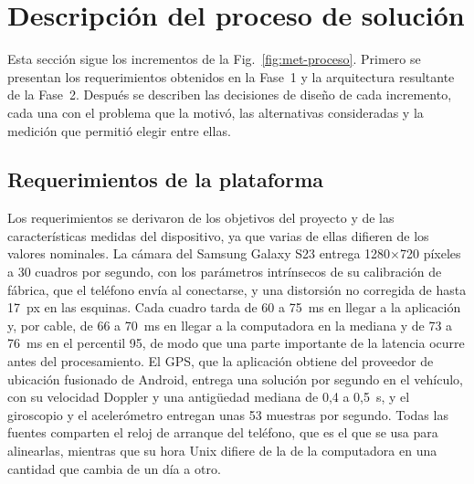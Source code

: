 \section{Descripción del proceso de solución}
\label{sec:res-proceso}

Esta sección sigue los incrementos de la Fig.~\ref{fig:met-proceso}.
Primero se presentan los requerimientos obtenidos en la Fase~1 y la arquitectura resultante de la Fase~2.
Después se describen las decisiones de diseño de cada incremento, cada una con el problema que la motivó, las alternativas consideradas y la medición que permitió elegir entre ellas.

\subsection{Requerimientos de la plataforma}
\label{sec:res-requerimientos}

Los requerimientos se derivaron de los objetivos del proyecto y de las características medidas del dispositivo, ya que varias de ellas difieren de los valores nominales.
La cámara del Samsung Galaxy S23 entrega 1280$\times$720 píxeles a 30 cuadros por segundo, con los parámetros intrínsecos de su calibración de fábrica, que el teléfono envía al conectarse, y una distorsión no corregida de hasta 17~px en las esquinas.
Cada cuadro tarda de 60 a 75~ms en llegar a la aplicación y, por cable, de 66 a 70~ms en llegar a la computadora en la mediana y de 73 a 76~ms en el percentil 95, de modo que una parte importante de la latencia ocurre antes del procesamiento.
El GPS, que la aplicación obtiene del proveedor de ubicación fusionado de Android, entrega una solución por segundo en el vehículo, con su velocidad Doppler y una antigüedad mediana de 0,4 a 0,5~s, y el giroscopio y el acelerómetro entregan unas 53 muestras por segundo.
Todas las fuentes comparten el reloj de arranque del teléfono, que es el que se usa para alinearlas, mientras que su hora Unix difiere de la de la computadora en una cantidad que cambia de un día a otro.

